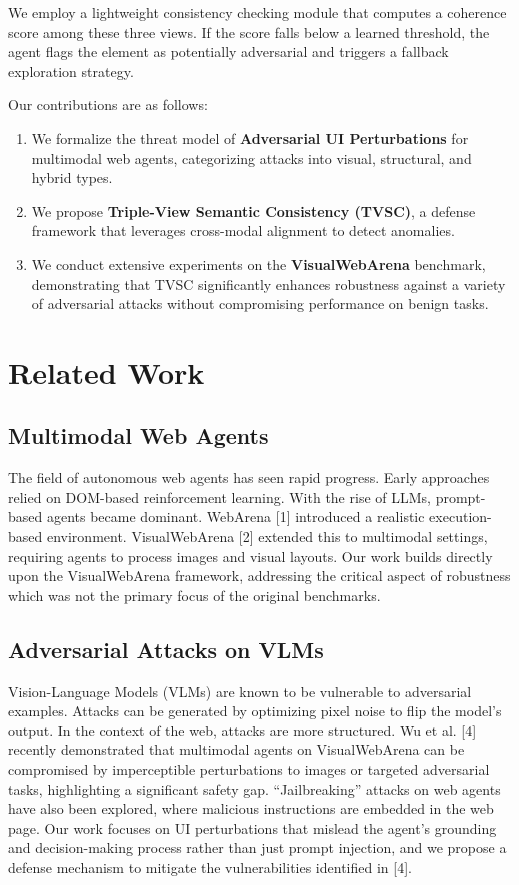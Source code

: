 \documentclass[runningheads]{llncs}
\begin{document}
We employ a lightweight consistency checking module that computes a coherence score among these three views. If the score falls below a learned threshold, the agent flags the element as potentially adversarial and triggers a fallback exploration strategy.

Our contributions are as follows:
\begin{enumerate}
    \item We formalize the threat model of \textbf{Adversarial UI Perturbations} for multimodal web agents, categorizing attacks into visual, structural, and hybrid types.
    \item We propose \textbf{Triple-View Semantic Consistency (TVSC)}, a defense framework that leverages cross-modal alignment to detect anomalies.
    \item We conduct extensive experiments on the \textbf{VisualWebArena} benchmark, demonstrating that TVSC significantly enhances robustness against a variety of adversarial attacks without compromising performance on benign tasks.
\end{enumerate}

\section{Related Work}

\subsection{Multimodal Web Agents}
The field of autonomous web agents has seen rapid progress. Early approaches relied on DOM-based reinforcement learning. With the rise of LLMs, prompt-based agents became dominant. WebArena [1] introduced a realistic execution-based environment. VisualWebArena [2] extended this to multimodal settings, requiring agents to process images and visual layouts. Our work builds directly upon the VisualWebArena framework, addressing the critical aspect of robustness which was not the primary focus of the original benchmarks.

\subsection{Adversarial Attacks on VLMs}
Vision-Language Models (VLMs) are known to be vulnerable to adversarial examples. Attacks can be generated by optimizing pixel noise to flip the model's output. In the context of the web, attacks are more structured. Wu et al. [4] recently demonstrated that multimodal agents on VisualWebArena can be compromised by imperceptible perturbations to images or targeted adversarial tasks, highlighting a significant safety gap. ``Jailbreaking'' attacks on web agents have also been explored, where malicious instructions are embedded in the web page. Our work focuses on UI perturbations that mislead the agent's grounding and decision-making process rather than just prompt injection, and we propose a defense mechanism to mitigate the vulnerabilities identified in [4].
\end{document}
